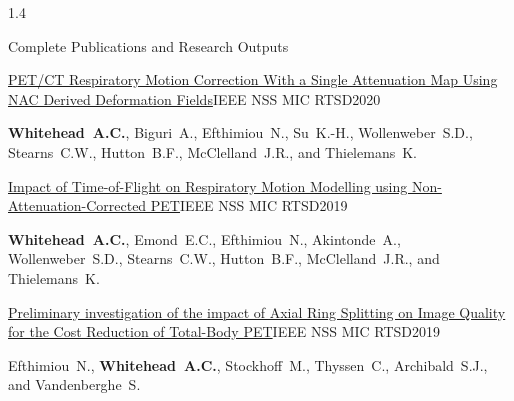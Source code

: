 \documentclass{cv}
\begin{document}
\begin{spacing}{1.4}
\begin{rSection}{Complete Publications and Research Outputs}
            \vspace{-0.5cm}
            \item \begin{rSubsection}{\href{https://doi.org/10.1109/NSS/MIC42677.2020.9507890}{PET/CT Respiratory Motion Correction With a Single Attenuation Map Using NAC Derived Deformation Fields}}{}{IEEE NSS MIC RTSD}{2020}
                \vspace{-0.25cm}
                \item \textbf{Whitehead~A.C.}, Biguri~A., Efthimiou~N., Su~K.-H., Wollenweber~S.D., Stearns~C.W., Hutton~B.F., McClelland~J.R., and Thielemans~K.
                \\
            \end{rSubsection}
    
            \vspace{-0.5cm}
            \item \begin{rSubsection}{\href{https://doi.org/10.1109/NSS/MIC42101.2019.9059812}{Impact of Time-of-Flight on Respiratory Motion Modelling using Non-Attenuation-Corrected PET}}{}{IEEE NSS MIC RTSD}{2019}
                \vspace{-0.25cm}
                \item \textbf{Whitehead~A.C.}, Emond~E.C., Efthimiou~N., Akintonde~A., Wollenweber~S.D., Stearns~C.W., Hutton~B.F., McClelland~J.R., and Thielemans~K.
                \\
            \end{rSubsection}
    
            \vspace{-0.5cm}
            \item \begin{rSubsection}{\href{https://doi.org/10.1109/NSS/MIC42101.2019.9059650}{Preliminary investigation of the impact of Axial Ring Splitting on Image Quality for the Cost Reduction of Total-Body PET}}{}{IEEE NSS MIC RTSD}{2019}
                \vspace{-0.25cm}
                \item Efthimiou~N., \textbf{Whitehead~A.C.}, Stockhoff~M., Thyssen~C., Archibald~S.J., and Vandenberghe~S.
                \\
            \end{rSubsection}

        \end{rSection}


\end{spacing}
\end{document}

